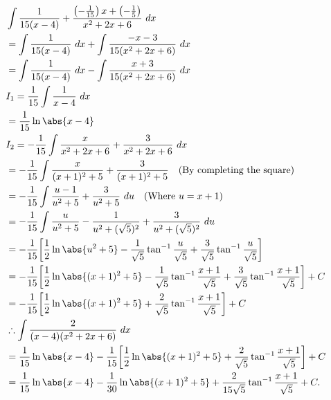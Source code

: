 \documentclass{report}
\begin{document}
    \begin{align*}
        &\int \frac{1}{15(x-4)} + \frac{\left(-\frac{1}{15}\right)x + \left(-\frac{1}{5}\right)}{x^{2}+2x+6}\ dx \\
        &=\int \frac{1}{15(x-4)}\ dx + \int \frac{-x-3}{15(x^{2}+2x+6)}\ dx \\
        &=\int \frac{1}{15(x-4)}\ dx - \int \frac{x+3}{15(x^{2}+2x+6)}\ dx \\
        &I_{1} = \frac{1}{15}\int \frac{1}{x-4}\ dx \\
        &=\frac{1}{15}\ln{\abs{x-4}} \\
        &I_{2} = -\frac{1}{15}\int \frac{x}{x^{2}+2x+6} + \frac{3}{x^{2}+2x+6}\ dx \\
        &=-\frac{1}{15}\int \frac{x}{(x+1)^{2}+5} + \frac{3}{(x+1)^{2}+5} \quad \text{(By completing the square)} \\
        &= -\frac{1}{15} \int \frac{u-1}{u^{2}+5} + \frac{3}{u^{2}+5}\ du \quad \text{(Where $u=x+1$)} \\
        &=-\frac{1}{15}\int \frac{u}{u^{2}+5} - \frac{1}{u^{2}+(\sqrt{5})^{2}} + \frac{3}{u^{2}+(\sqrt{5})^{2}}\ du \\
        &= -\frac{1}{15}\bigg[\frac{1}{2}\ln{\abs{u^{2}+5}}-\frac{1}{\sqrt{5}}\tan^{-1}{\frac{u}{\sqrt{5}}}+\frac{3}{\sqrt{5}}\tan^{-1}{\frac{u}{\sqrt{5}}}\bigg] \\
        &= -\frac{1}{15}\bigg[\frac{1}{2}\ln{\abs{(x+1)^{2}+5}}-\frac{1}{\sqrt{5}}\tan^{-1}{\frac{x+1}{\sqrt{5}}}+\frac{3}{\sqrt{5}}\tan^{-1}{\frac{x+1}{\sqrt{5}}}\bigg] + C \\
        &= -\frac{1}{15}\bigg[\frac{1}{2}\ln{\abs{(x+1)^{2}+5}}+\frac{2}{\sqrt{5}}\tan^{-1}{\frac{x+1}{\sqrt{5}}}\bigg] + C \\
        &\therefore \int \frac{2}{(x-4)(x^{2}+2x+6)}\ dx \\
        &=\frac{1}{15}\ln{\abs{x-4}}-\frac{1}{15}\bigg[\frac{1}{2}\ln{\abs{(x+1)^{2}+5}}+\frac{2}{\sqrt{5}}\tan^{-1}{\frac{x+1}{\sqrt{5}}}\bigg] + C \\
        &=\frac{1}{15}\ln{\abs{x-4}}-\frac{1}{30}\ln{\abs{(x+1)^{2}+5}}+\frac{2}{15\sqrt{5}}\tan^{-1}{\frac{x+1}{\sqrt{5}}} + C
    .\end{align*}
\end{document}
